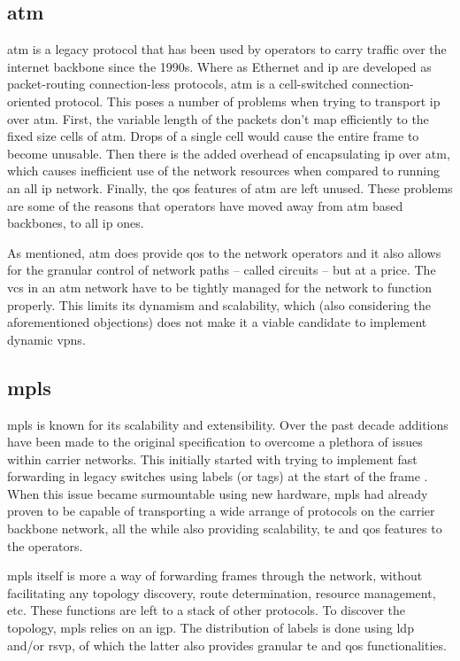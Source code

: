 \subsection{\acs{atm}} %
\label{sub:atm}
\ac{atm} is a legacy protocol that has been used by operators to carry traffic over the internet backbone since the 1990s. Where as Ethernet and \ac{ip} are developed as packet-routing connection-less protocols, \ac{atm} is a cell-switched connection-oriented protocol. This poses a number of problems when trying to transport \ac{ip} over \ac{atm}. First, the variable length of the packets don't map efficiently to the fixed size cells of \ac{atm}. Drops of a single cell would cause the entire frame to become unusable. Then there is the added overhead of encapsulating \ac{ip} over \ac{atm}, which causes inefficient use of the network resources when compared to running an all \ac{ip} network. Finally, the \ac{qos} features of \ac{atm} are left unused. These problems are some of the reasons that operators have moved away from \ac{atm} based backbones, to all \ac{ip} ones. 

As mentioned, \ac{atm} does provide \ac{qos} to the network operators and it also allows for the granular control of network paths -- called circuits -- but at a price. The \acp{vc} in an \ac{atm} network have to be tightly managed for the network to function properly. This limits its dynamism and scalability, which (also considering the aforementioned objections) does not make it a viable candidate to implement dynamic \acp{vpn}.


\subsection{\acs{mpls}} %
\label{sub:mpls}
\ac{mpls} is known for its scalability and extensibility. Over the past decade additions have been made to the original specification to overcome a plethora of issues within carrier networks. This initially started with trying to implement fast forwarding in legacy switches using labels (or tags) at the start of the frame \cite{tag-switching}. When this issue became surmountable using new hardware, \ac{mpls} had already proven to be capable of transporting a wide arrange of protocols on the carrier backbone network, all the while also providing scalability, \ac{te} and \ac{qos} features to the operators.

\ac{mpls} itself is more a way of forwarding frames through the network, without facilitating any topology discovery, route determination, resource management, etc. These functions are left to a stack of other protocols. To discover the topology, \ac{mpls} relies on an \ac{igp}. The distribution of labels is done using \ac{ldp} and/or \ac{rsvp}, of which the latter also provides granular \ac{te} and \ac{qos} functionalities.

